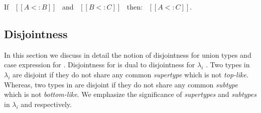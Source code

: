 \begin{comment}
\begin{proof}
  By induction on type A. All cases are trivial to prove.
\end{proof}
\end{comment}

\begin{lemma}
\label{lemma:union:trans}
If \ $[[A <: B]]$ \ and \ $[[B <: C]]$ \ then: \ $[[A <: C]]$.
\end{lemma}

\begin{comment}
\begin{proof}
  By induction on type B.
  \begin{itemize}
    \item Cases $[[Top]]$, $[[Bot]]$ and $[[Int]]$ are trivial to prove.
    \item Case $[[A -> B]]$ requires double induction on type $[[C]]$
          and $[[A]]$.
    \item Case $[[A \/ B]]$ requires \Cref{lemma:union:sub-or}
  \end{itemize}
\end{proof}

\begin{lemma}[Subtyping Union Inversion]
\label{lemma:union:sub-or}
  If \ $[[A \/ B <: C]]$ then:
  \begin{enumerate}
    \item $[[A <: C]]$ and
    \item $[[B <: C]]$
  \end{enumerate}
\end{lemma}
\end{comment}


\subsection{Disjointness}
\label{sec:union:disj}
\label{sec:union:disj}
In this section we discuss in detail the notion of disjointness for union types and case expression
for \cal.
Disjointness for \cal is dual to disjointness for $\lambda_i$ \cite{oliveira2016disjoint}.
Two types in $\lambda_i$ are disjoint if they do not share any common \emph{supertype} 
which is not \emph{top-like}.
Whereas, two types in \cal are disjoint if they do not share any common \emph{subtype} which is not
\emph{bottom-like}. We emphasize the significance of \emph{supertypes} and \emph{subtypes} in
$\lambda_i$ and \cal respectively.

